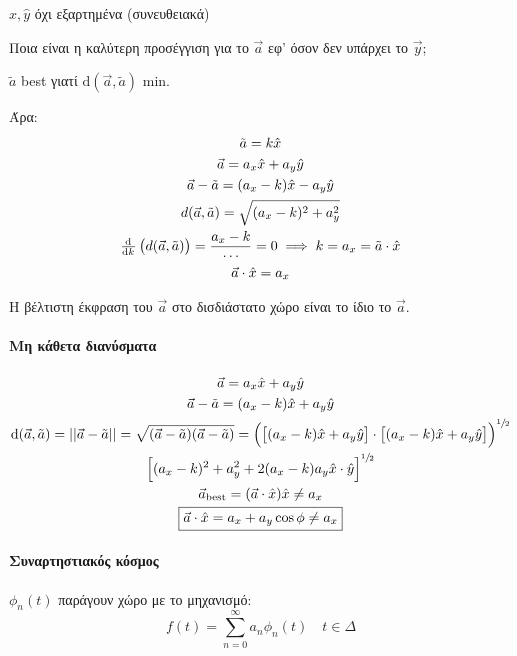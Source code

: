\documentclass[11pt,a4paper,titlepage,fleqn]{article}
\begin{document}
    \( \hat x,\hat y \) όχι εξαρτημένα (συνευθειακά)
    
    Ποια είναι η καλύτερη προσέγγιση για το \(\vec a\) εφ' όσον δεν υπάρχει
    το \( \vec y \);
    
    \( \tilde a \) best γιατί \(\mathrm d(\vec a,\tilde a)\) min.
    
    Άρα:
    \begin{gather*}
    	\tilde a = k\hat x \\
    	\vec a = a_x\hat x+a_y\hat y\\
    	\vec a -\tilde a = (a_x-k)\hat x - a_y\hat y\\
    	d(\vec a,\tilde a) = \sqrt{(a_x-k)^2+a_y^2} \\
    	\od{}{k}\left( d(\vec a,\tilde a) \right) = \frac{a_x-k}{\cdots}
    	= 0 \implies k=a_x = \tilde a \cdot \hat x\\
    	\vec a\cdot\hat x = a_x
    \end{gather*}
    
    Η βέλτιστη έκφραση του \( \vec a \) στο δισδιάστατο χώρο είναι το ίδιο το \( \vec a \).
    
    \paragraph{Μη κάθετα διανύσματα}
    
    
    \begin{gather*}
    \vec a = a_x\hat x+a_y\hat y\\
    \vec a - \tilde a = (a_x-k)\hat x+a_y\hat y\\
    \mathrm d(\vec a,\tilde a)= ||\vec a - \tilde a|| = \sqrt{(\vec a-\tilde a)(\vec a-\tilde a)}
    =\left(
    \left[ (a_x-k)\hat x+a_y\hat y \right]\cdot
    \left[ (a_x-k)\hat x+a_y\hat y \right]
    \right)^{\sfrac{1}{2}}\\
    \left[
    (a_x-k)^2+a_y^2+2(a_x-k)a_y\hat x\cdot\hat y
    \right]^{\sfrac{1}{2}} \\
    \vec a_{\mathrm{best}} = (\vec a \cdot \hat x)\hat x \neq a_x \\
    \boxed{\vec a \cdot \hat x = a_x+a_y\cos\phi\neq a_x}
    \end{gather*}
    


    \paragraph{Συναρτηστιακός κόσμος}
    \( \phi_n(t) \) παράγουν χώρο με το μηχανισμό:
    \[
    f(t)=\sum_{n=0}^\infty a_n\phi_n(t)\quad t \in \Delta
    \]
    
\end{document}
